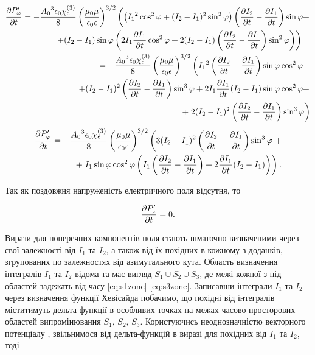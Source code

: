 \textcolor{blue} { \begin{equation*} \begin{aligned}
\frac{\partial P_\varphi^\prime}{\partial t}   = 
- \frac{ {A_0}^3 \epsilon_0 \chi_e^{(3)} }{ 8 } 
\left( \frac{\mu_0 \mu} {\epsilon_0 \epsilon} \right)^{3/2} \left(
\left( {I_1}^2 \cos^2 \varphi + ( I_2 - I_1 )^2 \sin^2 \varphi \right)
\left( \frac{\partial I_2}{\partial t} - \frac{\partial I_1}{\partial t} \right) \sin \varphi + \right. \\
\left. + (I_2 - I_1) \sin \varphi \left( 2 I_1 \frac{\partial I_1}{\partial t} \cos^2 \varphi + 
2 ( I_2 - I_1 ) \left( \frac{\partial I_2}{\partial t} - \frac{\partial I_1}{\partial t} \right) 
\sin^2 \varphi \right) \right) = \\ 
= - \frac{ {A_0}^3 \epsilon_0 \chi_e^{(3)} }{ 8 } 
\left( \frac{\mu_0 \mu} {\epsilon_0 \epsilon} \right)^{3/2} \left(
{I_1}^2 \left( \frac{\partial I_2}{\partial t} - \frac{\partial I_1}{\partial t} \right) 
\sin \varphi \cos^2 \varphi + \right. \\ \left. 
+ ( I_2 - I_1 )^2 \left( \frac{\partial I_2}{\partial t} - \frac{\partial I_1}{\partial t} \right) 
\sin^3 \varphi + 2 I_1 \frac{\partial I_1}{\partial t} (I_2 - I_1) 
\sin \varphi \cos^2 \varphi + \right. \\ 
+ \left. 2 ( I_2 - I_1 )^2 \left( \frac{\partial I_2}{\partial t} - \frac{\partial I_1}{\partial t} \right) 
\sin^3 \varphi \right)
\end{aligned} \end{equation*} }
%
\begin{equation*} \begin{aligned}
\frac{\partial P_\varphi^\prime}{\partial t} = 
- \frac{ {A_0}^3 \epsilon_0 \chi_e^{(3)} }{ 8 } 
\left( \frac{\mu_0 \mu} {\epsilon_0 \epsilon} \right)^{3/2} \left(
3 ( I_2 - I_1 )^2 \left( \frac{\partial I_2}{\partial t} - \frac{\partial I_1}{\partial t} \right)
\sin^3 \varphi \right. + \\
+ \left. I_1 \sin \varphi \cos^2 \varphi \left( 
I_1 \left( \frac{\partial I_2}{\partial t} - \frac{\partial I_1}{\partial t} \right) + 
2 \frac{\partial I_1}{\partial t} (I_2 - I_1) \right) \right).
\end{aligned} \end{equation*}

Так як поздовжня напруженість електричного поля відсутня, то

\begin{equation*} \begin{aligned}
\frac{\partial P_z^\prime}{\partial t} = 0.
\end{aligned} \end{equation*}

Вирази для поперечних компонентів поля стають шматочно-визначеними
через свої залежності від $ I_1 $ та $ I_2 $, а також від їх похідних в 
кожному з доданків, згрупованих по залежностях від азимутального кута.
Область визначення інтегралів $ I_1 $ та $ I_2 $ відома та має вигляд 
$ S_1 \cup S_2 \cup S_3 $, де межі кожної з під-областей задежать від часу 
\eqref{eq:s1zone}-\eqref{eq:s3zone}. Записавши інтеграли $ I_1 $ та $ I_2 $ 
через визначення функції Хевісайда побачимо, що похідні від інтегралів 
міститимуть дельта-функції в особливих точках на межах часово-просторових 
областей випромінювання $ S_1 $, $ S_2 $, $ S_3 $. Користуючись неоднозначністю 
векторного потенціалу \cite[ст. 77]{imp:LandauII}, звільнимося від дельта-функцій 
в виразі для похідних від $ I_1 $ та $ I_2 $, тоді

